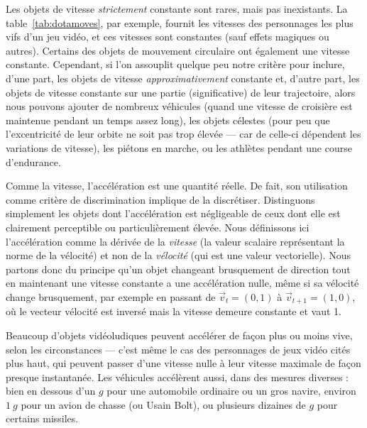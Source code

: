 	Les objets de vitesse \emph{strictement} constante sont rares, mais pas inexistants. La table~\ref{tab:dotamoves}, par exemple, fournit les vitesses des personnages les plus vifs d'un jeu vidéo, et ces vitesses sont constantes (sauf effets magiques ou autres). Certains des objets de mouvement circulaire ont également une vitesse constante. Cependant, si l'on assouplit quelque peu notre critère pour inclure, d'une part, les objets de vitesse \emph{approximativement} constante et, d'autre part, les objets de vitesse constante sur une partie (significative) de leur trajectoire, alors nous pouvons ajouter de nombreux véhicules (quand une vitesse de croisière est maintenue pendant un temps assez long), les objets célestes (pour peu que l'excentricité de leur orbite ne soit pas trop élevée --- car de celle-ci dépendent les variations de vitesse), les piétons en marche, ou les athlètes pendant une course d'endurance.
	
	Comme la vitesse, l'accélération est une quantité réelle. De fait, son utilisation comme critère de discrimination implique de la discrétiser. Distinguons simplement les objets dont l'accélération est négligeable de ceux dont elle est clairement perceptible ou particulièrement élevée. Nous définissons ici l'accélération comme la dérivée de la \emph{vitesse} (la valeur scalaire représentant la norme de la vélocité) et non de la \emph{vélocité} (qui est une valeur vectorielle). Nous partons donc du principe qu'un objet changeant brusquement de direction tout en maintenant une vitesse constante a une \og accélération \fg{} nulle, même si sa vélocité change brusquement, par exemple en passant de $\vec{v}_{t} = (0,1)$ à $\vec{v}_{t+1} = (1,0)$, où le vecteur vélocité est inversé mais la vitesse demeure constante et vaut 1.
	
	Beaucoup d'objets vidéoludiques peuvent accélérer de façon plus ou moins vive, selon les circonstances --- c'est même le cas des personnages de jeux vidéo cités plus haut, qui peuvent passer d'une vitesse nulle à leur vitesse maximale de façon presque instantanée.\footnotemark{} Les véhicules accélèrent aussi, dans des mesures diverses : bien en dessous d'un $g$ pour une automobile ordinaire ou un gros navire, environ $1~g$ pour un avion de chasse (ou Usain Bolt\footnotemark{}), ou plusieurs dizaines de $g$ pour certains missiles.\footnotemark{}

	\addtocounter{footnote}{-2}
	\addtocounter{footnote}{1}
	\addtocounter{footnote}{1}
	
